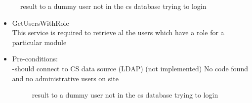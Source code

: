 \begin {itemize}
\begin{figure}[h!]
  \centering
  \caption{result to a dummy user not in the cs database trying to login }
\end{figure}

 
\begin {itemize}
\item {GetUsersWithRole}\\
This service is required to retrieve al the users which have a role for a particular module
\\

\item Pre-conditions:\\
-should connect to CS data source (LDAP) (not implemented) No code found and no administrative users on site\\
 \begin{figure}[h!]
  \centering
  \caption{result to a dummy user not in the cs database trying to login }
\end{figure}   


 \end {itemize}  
\end {itemize}